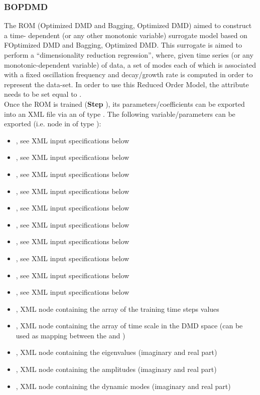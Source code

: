 \subsubsection{BOPDMD}
  The  ROM (Optimized DMD and Bagging, Optimized DMD) aimed to construct a time-
  dependent (or any other monotonic     variable) surrogate model based on FOptimized DMD and
  Bagging, Optimized DMD.     This surrogate is aimed to perform a ``dimensionality reduction
  regression'', where, given time     series (or any monotonic-dependent variable) of data, a set of
  modes each of which is associated     with a fixed oscillation frequency and decay/growth rate is
  computed     in order to represent the data-set.     In order to use this Reduced Order Model, the
   attribute      needs to be set equal to .     \\
  Once the ROM  is trained (\textbf{Step} ), its parameters/coefficients can be
  exported into an XML file     via an  of type . The following
  variable/parameters  can be exported (i.e.  node     in  of type
  ):     \begin{itemize}       \item {}, see XML input
  specifications below       \item {}, see XML input specifications below
  \item {}, see XML input specifications below       \item {}, see XML input
  specifications below       \item {}, see XML input specifications below
  \item {}, see XML input specifications below       \item {}, see
  XML input specifications below       \item {}, see XML input specifications below
  \item {}, see XML input specifications below       \item
  , see XML input specifications below       \item {}, XML node
  containing the array of the training time steps values       \item {}, XML
  node containing the array of time scale in the DMD space (can be used as mapping       between the
   and )       \item {}, XML node containing
  the eigenvalues (imaginary and real part)       \item {}, XML node containing
  the amplitudes (imaginary and real part)       \item {}, XML node containing the
  dynamic modes (imaginary and real part)     \end{itemize}

